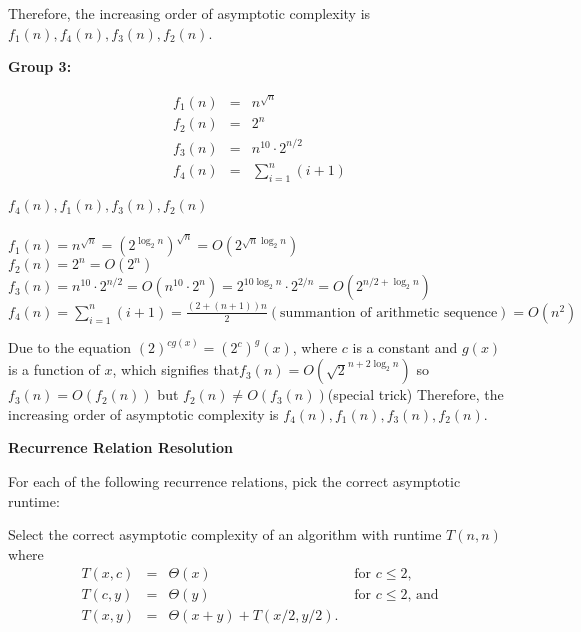 \documentclass[12pt,twoside]{article}
\begin{document}
\begin{problems}
\begin{problemparts}
Therefore, the increasing order of asymptotic complexity is $f_1(n),f_4(n),f_3(n),f_2(n)$.
\\
\fi

\problempart {} \textbf{Group 3:}

$$
\begin{array}{rcl}
f_1(n) &=& n^{\sqrt{n}} \\
f_2(n) &=& 2^n \\
f_3(n) &=& n^{10} \cdot 2^{n / 2} \\
f_4(n) &=& \displaystyle\sum_{i = 1}^{n} (i + 1)
\end{array}
$$

\ifsolution \solution{}
$f_4(n),f_1(n),f_3(n),f_2(n)$
\\
\\
$f_1(n) = n^{\sqrt{n}}=(2^{\log_2{n}})^{\sqrt{n}}=O(2^{\sqrt{n}\log_2{n}})$\\
$f_2(n) = 2^n = O(2^n)$\\
$f_3(n) = n^{10} \cdot 2^{n / 2} = O(n^{10}\cdot 2^{n})=2^{10\log_2{n}}\cdot2^{2/n}=O(2^{n/2+\log_2{n}})$\\
$f_4(n) = \displaystyle\sum_{i = 1}^{n} (i + 1) = \frac{(2+(n+1))n}{2}
(\text{summantion of arithmetic sequence}) = O(n^2)$

{\color{red}Due to the equation $(2)^{cg(x)}=(2^c)^g(x)$, where $c$ is a constant and $g(x)$ is a function of $x$,
 which signifies that$f_3(n) = O(\sqrt{2}^{n+2\log_2{n}})$ so $f_3(n)=O(f_2(n))$ but $f_2(n)\neq O(f_3(n))$(special trick)}
Therefore, the increasing order of asymptotic complexity is $f_4(n),f_1(n),f_3(n),f_2(n)$.
\\
\fi

\end{problemparts}

\problem {} \textbf{Recurrence Relation Resolution}

For each of the following recurrence relations,
pick the correct asymptotic runtime:

\begin{problemparts}

\problempart {}
Select the correct asymptotic complexity
of an algorithm with runtime $T(n, n)$
where 
$$
\begin{array}{rcll}
T(x, c) &=& \Theta(x) & \textrm{ for $c \le 2$}, \\
T(c, y) &=& \Theta(y) & \textrm{ for $c \le 2$, and} \\
T(x, y) &=& \Theta(x + y) + T(x / 2, y / 2).
\end{array}
$$


\end{problemparts}
\end{problems}
\end{document}
